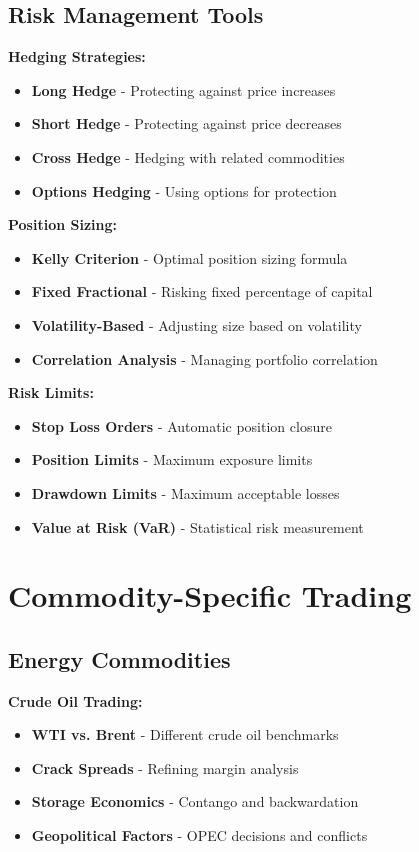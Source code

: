 \documentclass[12pt]{article}
\begin{document}
\subsection{Risk Management Tools}

\textbf{Hedging Strategies:}
\begin{itemize}
    \item \textbf{Long Hedge} - Protecting against price increases
    \item \textbf{Short Hedge} - Protecting against price decreases
    \item \textbf{Cross Hedge} - Hedging with related commodities
    \item \textbf{Options Hedging} - Using options for protection
\end{itemize}

\textbf{Position Sizing:}
\begin{itemize}
    \item \textbf{Kelly Criterion} - Optimal position sizing formula
    \item \textbf{Fixed Fractional} - Risking fixed percentage of capital
    \item \textbf{Volatility-Based} - Adjusting size based on volatility
    \item \textbf{Correlation Analysis} - Managing portfolio correlation
\end{itemize}

\textbf{Risk Limits:}
\begin{itemize}
    \item \textbf{Stop Loss Orders} - Automatic position closure
    \item \textbf{Position Limits} - Maximum exposure limits
    \item \textbf{Drawdown Limits} - Maximum acceptable losses
    \item \textbf{Value at Risk (VaR)} - Statistical risk measurement
\end{itemize}

\section{Commodity-Specific Trading}

\subsection{Energy Commodities}

\textbf{Crude Oil Trading:}
\begin{itemize}
    \item \textbf{WTI vs. Brent} - Different crude oil benchmarks
    \item \textbf{Crack Spreads} - Refining margin analysis
    \item \textbf{Storage Economics} - Contango and backwardation
    \item \textbf{Geopolitical Factors} - OPEC decisions and conflicts
\end{itemize}
\end{document}
